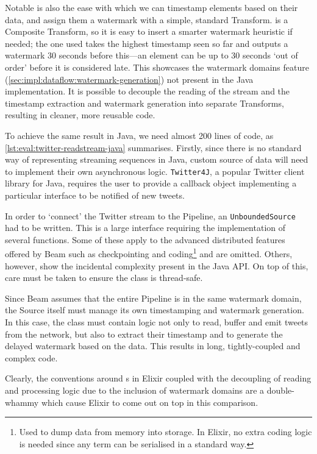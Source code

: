Notable is also the ease with which we can timestamp elements based on their data, and assign them a watermark with a simple, standard Transform.
 is a Composite Transform, so it is easy to insert a smarter watermark heuristic if needed; the one used takes the highest timestamp seen so far and outputs a watermark 30 seconds before this---an element can be up to 30 seconds `out of order' before it is considered late.
This showcases the watermark domains feature (\cref{sec:impl:dataflow:watermark-generation}) not present in the Java implementation.
It is possible to decouple the reading of the stream and the timestamp extraction and watermark generation into separate Transforms, resulting in cleaner, more reusable code.

To achieve the same result in Java, we need almost 200 lines of code, as \cref{lst:eval:twitter-readstream-java} summarises.
Firstly, since there is no standard way of representing streaming sequences in Java, custom source of data will need to implement their own asynchronous logic.
\texttt{Twitter4J}, a popular Twitter client library for Java, requires the user to provide a callback object implementing a particular interface to be notified of new tweets.

In order to `connect' the Twitter stream to the Pipeline, an \texttt{UnboundedSource} had to be written.
This is a large interface requiring the implementation of several functions.
Some of these apply to the advanced distributed features offered by Beam such as checkpointing and coding\footnote{
Used to dump data from memory into storage. In Elixir, no extra coding logic is needed since any term can be serialised in a standard way.
} and are omitted.
Others, however, show the incidental complexity present in the Java API.
On top of this, care must be taken to ensure the class is thread-safe.

Since Beam assumes that the entire Pipeline is in the same watermark domain, the Source itself must manage its own timestamping and watermark generation.
In this case, the class must contain logic not only to read, buffer and emit tweets from the network, but also to extract their timestamp and to generate the delayed watermark based on the data.
This results in long, tightly-coupled and complex code.

Clearly, the conventions around s in Elixir coupled with the decoupling of reading and processing logic due to the inclusion of watermark domains are a double-whammy which cause Elixir to come out on top in this comparison.

